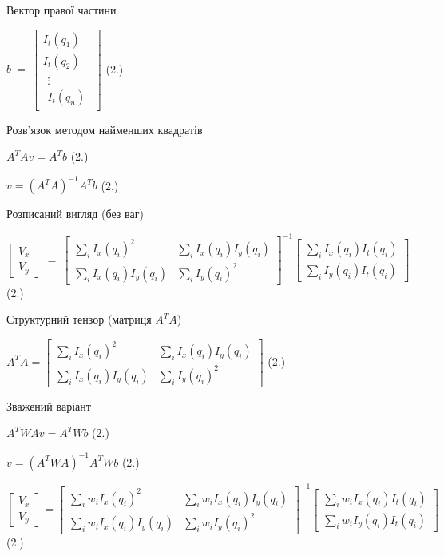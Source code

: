 \documentclass[
]{article}
\begin{document}
Вектор правої частини

\(b\  = \ \begin{bmatrix}
I_{t}\left( q_{1} \right) \\
I_{t}\left( q_{2} \right) \\
\begin{matrix}
 \vdots \\
I_{t}\left( q_{n} \right)
\end{matrix}
\end{bmatrix}\) (2.)

Розв'язок методом найменших квадратів

\(A^{T}Av = A^{T}b\) (2.)

\(v = \left( A^{T}A \right)^{- 1}A^{T}b\) (2.)

Розписаний вигляд (без ваг)

\(\begin{bmatrix}
V_{x} \\
V_{y}
\end{bmatrix}\  = \ \begin{bmatrix}
\sum_{i}^{}{I_{x}\left( q_{i} \right)^{2}} & \sum_{i}^{}{I_{x}\left( q_{i} \right)I_{y}\left( q_{i} \right)} \\
\sum_{i}^{}{I_{x}\left( q_{i} \right)I_{y}\left( q_{i} \right)} & \sum_{i}^{}{I_{y}\left( q_{i} \right)^{2}}
\end{bmatrix}^{- 1}\begin{bmatrix}
\sum_{i}^{}{I_{x}\left( q_{i} \right)I_{t}\left( q_{i} \right)} \\
\sum_{i}^{}{I_{y}\left( q_{i} \right)I_{t}\left( q_{i} \right)}
\end{bmatrix}\) (2.)

Структурний тензор (матриця \(A^{T}A\))

\(A^{T}A = \begin{bmatrix}
\sum_{i}^{}{I_{x}\left( q_{i} \right)^{2}} & \sum_{i}^{}{I_{x}\left( q_{i} \right)I_{y}\left( q_{i} \right)} \\
\sum_{i}^{}{I_{x}\left( q_{i} \right)I_{y}\left( q_{i} \right)} & \sum_{i}^{}{I_{y}\left( q_{i} \right)^{2}}
\end{bmatrix}\) (2.)

Зважений варіант

\(A^{T}WAv = A^{T}Wb\) (2.)

\(v = \left( A^{T}WA \right)^{- 1}A^{T}Wb\) (2.)

\(\begin{bmatrix}
V_{x} \\
V_{y}
\end{bmatrix} = \begin{bmatrix}
\sum_{i}^{}{w_{i}I_{x}\left( q_{i} \right)^{2}} & \sum_{i}^{}{w_{i}I_{x}\left( q_{i} \right)I_{y}\left( q_{i} \right)} \\
\sum_{i}^{}{w_{i}I_{x}\left( q_{i} \right)I_{y}\left( q_{i} \right)} & \sum_{i}^{}{w_{i}I_{y}\left( q_{i} \right)^{2}}
\end{bmatrix}^{- 1}\begin{bmatrix}
\sum_{i}^{}{w_{i}I_{x}\left( q_{i} \right)I_{t}\left( q_{i} \right)} \\
\sum_{i}^{}{w_{i}I_{y}\left( q_{i} \right)I_{t}\left( q_{i} \right)}
\end{bmatrix}\) (2.)
\end{document}
